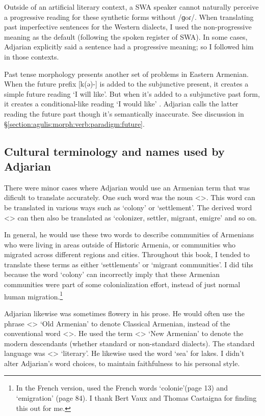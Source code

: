 Outside of an artificial literary context, a SWA speaker cannot naturally perceive a progressive reading for these synthetic forms without /ɡoɾ/. When translating past imperfective sentences for the Western dialects, I used the non-progressive meaning as the default (following the spoken register of SWA).  In some cases, Adjarian explicitly said a sentence had a progressive meaning; so I followed him in those contexts.


Past tense morphology presents another set of problems in Eastern Armenian. When the future prefix [k(ə)-] is added to the subjunctive present, it creates a simple future reading `I will like'. But when it's added to a subjunctive past form, it creates a conditional-like reading `I would like' \citep[\S6.5.3]{DolatianEtAl-prep-IranianGrammar}.   Adjarian calls the latter reading the future past though it's semantically inaccurate. See discussion in \S\ref{section:agulis:morph:verb:paradigm:future}. 
 

 
\subsection{Cultural terminology and names used by Adjarian}\label{sec:HossepIntro:translation:name}

There were minor cases where Adjarian would use an Armenian term that was dificult to translate accurately. One such word was the noun <>. This word can be translated in various ways such as `colony' or `settlement'. The derived word <> can then also be translated as `colonizer, settler, migrant, emigre' and so on. 

In general, he would use these two words to describe communities of Armenians who were living in areas outside of Historic Armenia, or communities who migrated across different regions and cities. Throughout this book, I tended to translate these terms as either   `settlements' or `migrant communities'. I did tihs because the word `colony' can incorrectly imply that these Armenian communities were part of some colonialization effort, instead of just normal human migration.\footnote{In the French version, \citet{Adjarian-1909-ClassificationArmenianDialect} used the French words `colonie'(page 13) and `emigration' (page 84).  I thank Bert Vaux and Thomas Castaigna for finding this out for me.} 

Adjarian likewise was  sometimes flowery in his prose. He would often use the phrase <> `Old Armenian' to denote Classical Armenian, instead of the conventional word <>. He used the term <> `New Armenian' to denote the modern descendants (whether standard or non-standard dialects). The standard language was <> `literary'. He likewise used the word `sea' for lakes.    I didn't alter Adjarian's word choices, to maintain faithfulness to his personal style. 


